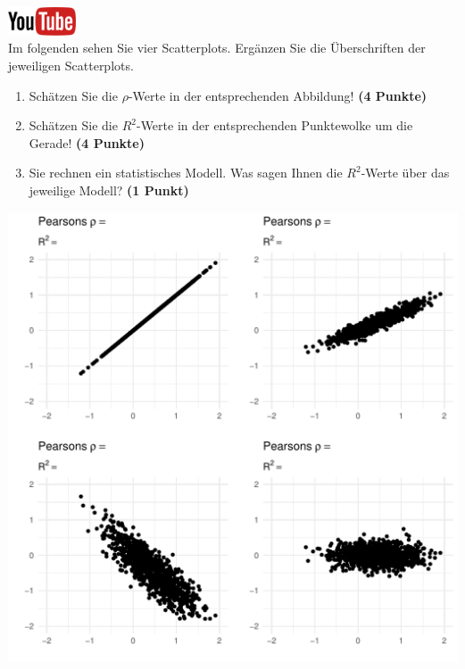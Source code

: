 \documentclass[a4paper, 9pt]{scrartcl}\usepackage[]{graphicx}\usepackage[]{xcolor}
\makeatletter
\def\maxwidth{ %
  \ifdim\Gin@nat@width>\linewidth
    \linewidth
  \else
    \Gin@nat@width
  \fi
}
\makeatother
\begin{document}
\hfill\href{https://youtu.be/2QJa19ZwLls}{\includegraphics[width =
  2cm]{img/youtube}}\\[1Ex]

Im folgenden sehen Sie vier Scatterplots. Erg{\"a}nzen Sie die {\"U}berschriften
der jeweiligen Scatterplots.


\begin{enumerate}
\item Sch{\"a}tzen Sie die $\rho$-Werte in der entsprechenden
  Abbildung! \textbf{(4 Punkte)}
\item Sch{\"a}tzen Sie die $R^2$-Werte in der entsprechenden
  Punktewolke um die Gerade! \textbf{(4 Punkte)}
\item Sie rechnen ein statistisches Modell. Was sagen Ihnen die $R^2$-Werte
  {\"u}ber das jeweilige Modell? \textbf{(1 Punkt)}
\end{enumerate}




{\centering \includegraphics[width=\maxwidth]{img/correlation-02-1} 

}
\end{document}
